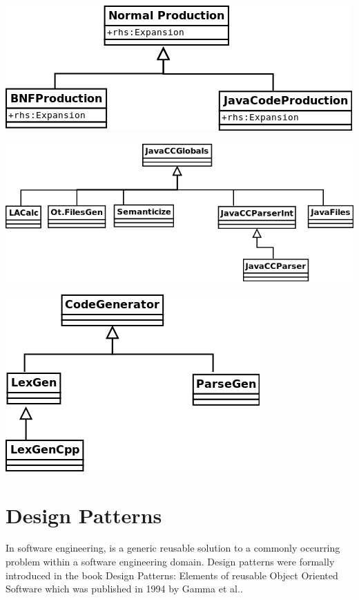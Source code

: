\documentclass[•]{book}
\begin{document}
\begin{center}
\includegraphics[scale=0.5]{NormalProduction.png}
\end{center}

\begin{center}
\includegraphics[scale=0.5]{javaCCGlobals.png}
\end{center}

\begin{center}
\includegraphics[scale=0.5]{CodeGenerator.png}
\end{center}

\section{Design Patterns}
In software engineering, is a generic reusable solution to a commonly occurring problem within a software engineering domain. Design patterns were formally introduced in the book Design Patterns: Elements of reusable Object Oriented Software which was published in 1994 by Gamma et al.\cite{gamma1994}.
\end{document}
